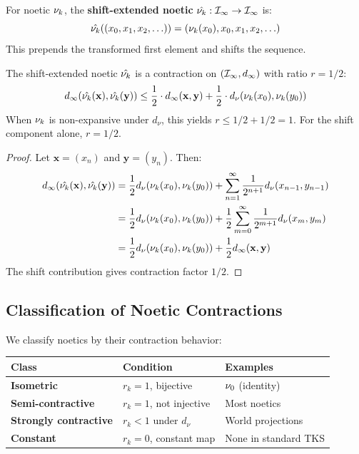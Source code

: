 \begin{definition}
\label{def:shift-extended}
For noetic $\nu_{k}$, the \textbf{shift-extended noetic} $\hat{\nu_{k}} : \mathcal{I}_\infty \to \mathcal{I}_\infty$ is:
\[
\hat{\nu_{k}}((x_0, x_1, x_2, \ldots)) = (\nu_{k}(x_0), x_0, x_1, x_2, \ldots)
\]
This prepends the transformed first element and shifts the sequence.
\end{definition}

\begin{theorem}
\label{thm:shift-extended-contraction}
The shift-extended noetic $\hat{\nu_{k}}$ is a contraction on $(\mathcal{I}_\infty, d_\infty)$ with ratio $r = 1/2$:
\[
d_\infty(\hat{\nu_{k}}(\mathbf{x}), \hat{\nu_{k}}(\mathbf{y})) \leq \frac{1}{2} \cdot d_\infty(\mathbf{x}, \mathbf{y}) + \frac{1}{2} \cdot d_\nu(\nu_{k}(x_0), \nu_{k}(y_0))
\]
When $\nu_{k}$ is non-expansive under $d_\nu$, this yields $r \leq 1/2 + 1/2 = 1$. For the shift component alone, $r = 1/2$.
\end{theorem}

\begin{proof}
Let $\mathbf{x} = (x_n)$ and $\mathbf{y} = (y_n)$. Then:
\begin{align*}
d_\infty(\hat{\nu_{k}}(\mathbf{x}), \hat{\nu_{k}}(\mathbf{y}))
&= \frac{1}{2} d_\nu(\nu_{k}(x_0), \nu_{k}(y_0)) + \sum_{n=1}^\infty \frac{1}{2^{n+1}} d_\nu(x_{n-1}, y_{n-1}) \\
&= \frac{1}{2} d_\nu(\nu_{k}(x_0), \nu_{k}(y_0)) + \frac{1}{2} \sum_{m=0}^\infty \frac{1}{2^{m+1}} d_\nu(x_m, y_m) \\
&= \frac{1}{2} d_\nu(\nu_{k}(x_0), \nu_{k}(y_0)) + \frac{1}{2} d_\infty(\mathbf{x}, \mathbf{y})
\end{align*}
The shift contribution gives contraction factor $1/2$.
\end{proof}

\subsection{Classification of Noetic Contractions}

\begin{definition}
\label{def:contraction-classes}
We classify noetics by their contraction behavior:

\begin{center}
\begin{tabular}{lll}
\toprule
\textbf{Class} & \textbf{Condition} & \textbf{Examples} \\
\midrule
\textbf{Isometric} & $r_k = 1$, bijective & $\nu_{0}$ (identity) \\
\textbf{Semi-contractive} & $r_k = 1$, not injective & Most noetics \\
\textbf{Strongly contractive} & $r_k < 1$ under $d_\nu$ & World projections \\
\textbf{Constant} & $r_k = 0$, constant map & None in standard TKS \\
\bottomrule
\end{tabular}
\end{center}
\end{definition}


